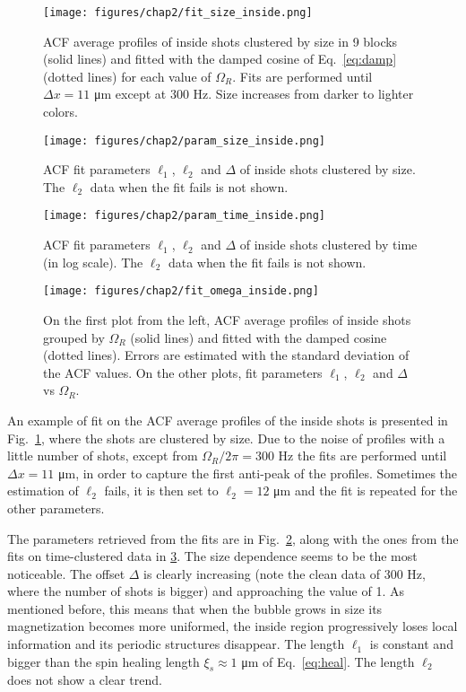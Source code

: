 \begin{figure}[ht!]
    \centering
    \texttt{[image: figures/chap2/fit\_size\_inside.png]}
    \caption{ACF average profiles of inside shots clustered by size in 9 blocks (solid lines) and fitted with the damped cosine of Eq.\ \eqref{eq:damp} (dotted lines) for each value of $\Omega_R$. Fits are performed until $\Delta x = 11$ \unit{\micro\meter} except at 300 Hz. Size increases from darker to lighter colors.}
    \label{fig:fit_size_inside}
\end{figure}
\begin{figure}[ht!]
    \centering
    \texttt{[image: figures/chap2/param\_size\_inside.png]}
    \caption{ACF fit parameters $\ell_1$, $\ell_2$ and $\Delta$ of inside shots clustered by size. The $\ell_2$ data when the fit fails is not shown.}
    \label{fig:param_size_inside}
\end{figure}
\begin{figure}[ht!]
    \centering
    \texttt{[image: figures/chap2/param\_time\_inside.png]}
    \caption{ACF fit parameters $\ell_1$, $\ell_2$ and $\Delta$ of inside shots clustered by time (in log scale). The $\ell_2$ data when the fit fails is not shown.}
    \label{fig:param_time_inside}
\end{figure}
\begin{figure}[ht!]
    \centering
    \texttt{[image: figures/chap2/fit\_omega\_inside.png]}
    \caption{On the first plot from the left, ACF average profiles of inside shots grouped by $\Omega_R$ (solid lines) and fitted with the damped cosine (dotted lines). Errors are estimated with the standard deviation of the ACF values. On the other plots, fit parameters $\ell_1$, $\ell_2$ and $\Delta$ vs $\Omega_R$.}
    \label{fig:fit_omega_inside}
\end{figure}
An example of fit on the ACF average profiles of the inside shots is presented in Fig.\ \ref{fig:fit_size_inside}, where the shots are clustered by size. Due to the noise of profiles with a little number of shots, except from $\Omega_R/2\pi = 300$ \unit{\hertz} the fits are performed until $\Delta x = 11$ \unit{\micro\meter}, in order to capture the first anti-peak of the profiles. Sometimes the estimation of $\ell_2$ fails, it is then set to $\ell_2 = 12$ \unit{\micro\meter} and the fit is repeated for the other parameters.

The parameters retrieved from the fits are in Fig.\ \ref{fig:param_size_inside}, along with the ones from the fits on time-clustered data in \ref{fig:param_time_inside}. 
The size dependence seems to be the most noticeable. The offset $\Delta$ is clearly increasing (note the clean data of 300 Hz, where the number of shots is bigger) and approaching the value of 1. As mentioned before, this means that when the bubble grows in size its magnetization becomes more uniformed, the inside region progressively loses local information and its periodic structures disappear.
The length $\ell_1$ is constant and bigger than the spin healing length $\xi_s \approx 1$ \unit{\micro\meter} of Eq.\ \eqref{eq:heal}. 
The length $\ell_2$ does not show a clear trend.

